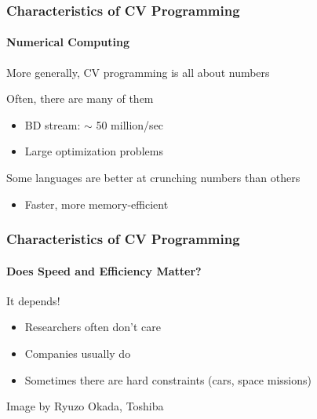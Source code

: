 \documentclass[xetex,professionalfont]{beamer}
\begin{document}
\begin{frame}
\frametitle{Characteristics of CV Programming}
\framesubtitle{Numerical Computing}

More generally, CV programming is all about numbers

\medskip
Often, there are many of them
\begin{itemize}
	\item BD stream: $\sim$ 50 million/sec %
	\item Large optimization problems
\end{itemize}

\medskip
Some languages are better at crunching numbers than others
\begin{itemize}
	\item Faster, more memory-efficient
\end{itemize}

\end{frame}


\begin{frame}
\frametitle{Characteristics of CV Programming}
\framesubtitle{Does Speed and Efficiency Matter?}

It depends!
\begin{itemize}
	\item Researchers often don't care %
	\item Companies usually do %
	\item Sometimes there are hard constraints (cars, space missions)
\end{itemize}

\medskip
\begin{center}
	{\centering Image by Ryuzo Okada, Toshiba}
\end{center}

\end{frame}

\end{document}
